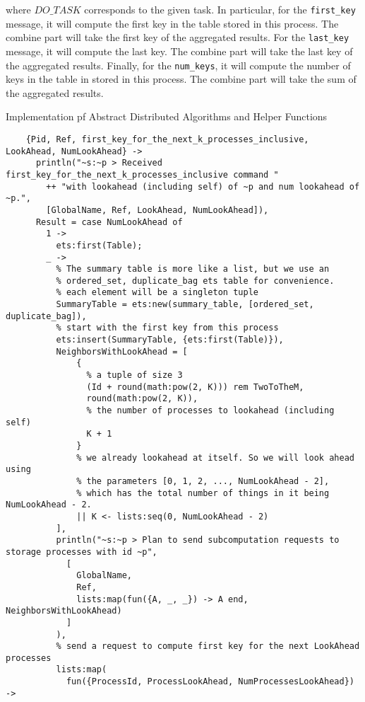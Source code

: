 \documentclass[11pt]{article}
\begin{document}
\noindent where $DO\_TASK$ corresponds to the given task. In particular, for the \texttt{first\_key} message, it will compute the first key in the table stored in this process. The combine part will 
take the first key of the aggregated results. For the \texttt{last\_key} message, it will compute the last key. The combine part will 
take the last key of the aggregated results. Finally, for the \texttt{num\_keys}, it will compute the number of keys in the table in  stored in this process. The combine part will take the sum of the aggregated results.



\begin{algorithm}[H]
  \caption{Implementation pf Abstract Distributed Algorithms and Helper Functions}\label{implementation}      
\begin{lstlisting}
    {Pid, Ref, first_key_for_the_next_k_processes_inclusive, LookAhead, NumLookAhead} ->
      println("~s:~p > Received first_key_for_the_next_k_processes_inclusive command "
        ++ "with lookahead (including self) of ~p and num lookahead of ~p.",
        [GlobalName, Ref, LookAhead, NumLookAhead]),
      Result = case NumLookAhead of
        1 ->
          ets:first(Table);
        _ ->
          % The summary table is more like a list, but we use an 
          % ordered_set, duplicate_bag ets table for convenience.
          % each element will be a singleton tuple
          SummaryTable = ets:new(summary_table, [ordered_set, duplicate_bag]),
          % start with the first key from this process
          ets:insert(SummaryTable, {ets:first(Table)}),
          NeighborsWithLookAhead = [
              {
                % a tuple of size 3
                (Id + round(math:pow(2, K))) rem TwoToTheM,
                round(math:pow(2, K)),
                % the number of processes to lookahead (including self)
                K + 1
              }
              % we already lookahead at itself. So we will look ahead using
              % the parameters [0, 1, 2, ..., NumLookAhead - 2],
              % which has the total number of things in it being NumLookAhead - 2.
              || K <- lists:seq(0, NumLookAhead - 2)
          ],
          println("~s:~p > Plan to send subcomputation requests to storage processes with id ~p",
            [
              GlobalName,
              Ref,
              lists:map(fun({A, _, _}) -> A end, NeighborsWithLookAhead)
            ]
          ),
          % send a request to compute first key for the next LookAhead processes
          lists:map(
            fun({ProcessId, ProcessLookAhead, NumProcessesLookAhead}) -> 

\end{lstlisting}
\end{algorithm}
\end{document}
